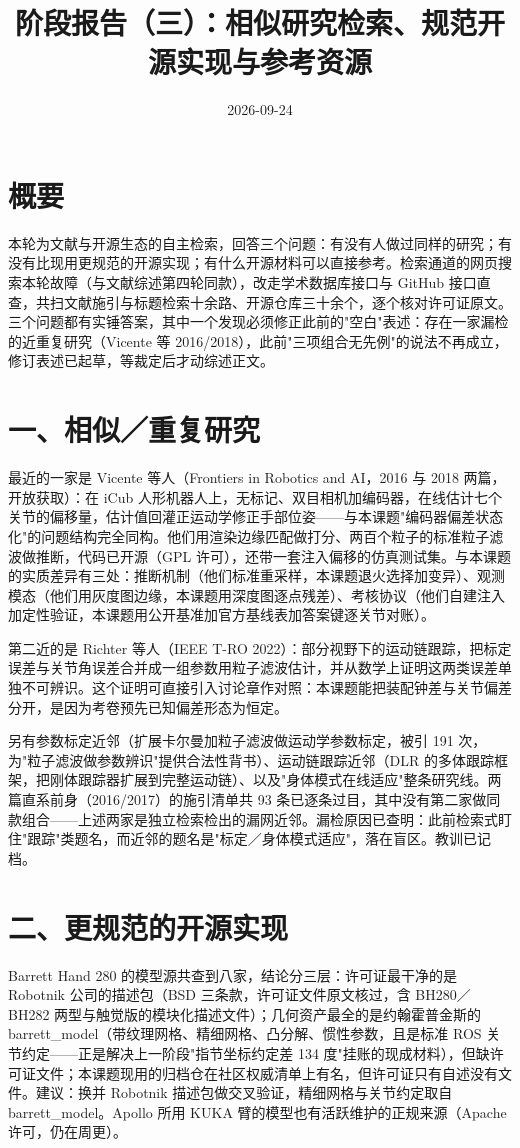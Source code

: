 \documentclass{article}
\title{阶段报告（三）：相似研究检索、规范开源实现与参考资源}
\author{}
\date{2026-09-24}
\begin{document}
\maketitle

\section{概要}
本轮为文献与开源生态的自主检索，回答三个问题：有没有人做过同样的研究；有没有比现用更规范的开源实现；有什么开源材料可以直接参考。检索通道的网页搜索本轮故障（与文献综述第四轮同款），改走学术数据库接口与 GitHub 接口直查，共扫文献施引与标题检索十余路、开源仓库三十余个，逐个核对许可证原文。三个问题都有实锤答案，其中一个发现必须修正此前的"空白"表述：存在一家漏检的近重复研究（Vicente 等 2016/2018），此前"三项组合无先例"的说法不再成立，修订表述已起草，等裁定后才动综述正文。

\section{一、相似／重复研究}
最近的一家是 Vicente 等人（Frontiers in Robotics and AI，2016 与 2018 两篇，开放获取）：在 iCub 人形机器人上，无标记、双目相机加编码器，在线估计七个关节的偏移量，估计值回灌正运动学修正手部位姿——与本课题"编码器偏差状态化"的问题结构完全同构。他们用渲染边缘匹配做打分、两百个粒子的标准粒子滤波做推断，代码已开源（GPL 许可），还带一套注入偏移的仿真测试集。与本课题的实质差异有三处：推断机制（他们标准重采样，本课题退火选择加变异）、观测模态（他们用灰度图边缘，本课题用深度图逐点残差）、考核协议（他们自建注入加定性验证，本课题用公开基准加官方基线表加答案键逐关节对账）。

第二近的是 Richter 等人（IEEE T-RO 2022）：部分视野下的运动链跟踪，把标定误差与关节角误差合并成一组参数用粒子滤波估计，并从数学上证明这两类误差单独不可辨识。这个证明可直接引入讨论章作对照：本课题能把装配钟差与关节偏差分开，是因为考卷预先已知偏差形态为恒定。

另有参数标定近邻（扩展卡尔曼加粒子滤波做运动学参数标定，被引 191 次，为"粒子滤波做参数辨识"提供合法性背书）、运动链跟踪近邻（DLR 的多体跟踪框架，把刚体跟踪器扩展到完整运动链）、以及"身体模式在线适应"整条研究线。两篇直系前身（2016/2017）的施引清单共 93 条已逐条过目，其中没有第二家做同款组合——上述两家是独立检索检出的漏网近邻。漏检原因已查明：此前检索式盯住"跟踪"类题名，而近邻的题名是"标定／身体模式适应"，落在盲区。教训已记档。

\section{二、更规范的开源实现}
Barrett Hand 280 的模型源共查到八家，结论分三层：许可证最干净的是 Robotnik 公司的描述包（BSD 三条款，许可证文件原文核过，含 BH280／BH282 两型与触觉版的模块化描述文件）；几何资产最全的是约翰霍普金斯的 barrett\_model（带纹理网格、精细网格、凸分解、惯性参数，且是标准 ROS 关节约定——正是解决上一阶段"指节坐标约定差 134 度"挂账的现成材料），但缺许可证文件；本课题现用的归档仓在社区权威清单上有名，但许可证只有自述没有文件。建议：换并 Robotnik 描述包做交叉验证，精细网格与关节约定取自 barrett\_model。Apollo 所用 KUKA 臂的模型也有活跃维护的正规来源（Apache 许可，仍在周更）。
\end{document}
